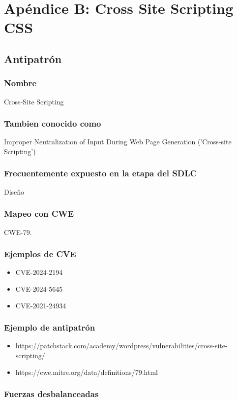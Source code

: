 \chapter{Apéndice B: Cross Site Scripting CSS}

\section{Antipatrón}

\subsection{Nombre}
Cross-Site Scripting
\subsection{Tambien conocido como}
Improper Neutralization of Input During Web Page Generation ('Cross-site Scripting')
\subsection{Frecuentemente expuesto en la etapa del SDLC}
Diseño
\subsection{Mapeo con CWE}
CWE-79. 
\subsection{Ejemplos de CVE}
\begin{itemize}
    \item CVE-2024-2194
    \item CVE-2024-5645
    \item CVE-2021-24934
\end{itemize}

\subsection{Ejemplo de antipatrón}

\begin{itemize}
    \item https://patchstack.com/academy/wordpress/vulnerabilities/cross-site-scripting/
    \item https://cwe.mitre.org/data/definitions/79.html
\end{itemize}

\subsection{Fuerzas desbalanceadas}

